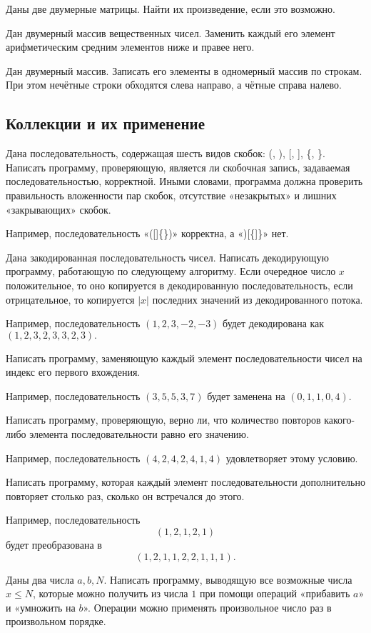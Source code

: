 \task Даны две двумерные матрицы. Найти их произведение, если это
возможно.

\task Дан двумерный массив вещественных чисел. Заменить каждый его
элемент арифметическим средним элементов ниже и правее него.

\task Дан двумерный массив. Записать его элементы в одномерный массив
по строкам. При этом нечётные строки обходятся слева направо, а чётные
справа налево.

\subsection{Коллекции и их применение}

\task Дана последовательность, содержащая шесть видов скобок: (, ), [,
], \{, \}. Написать программу, проверяющую, является ли скобочная
запись, задаваемая последовательностью, корректной. Иными словами,
программа должна проверить правильность вложенности пар скобок,
отсутствие «незакрытых» и лишних «закрывающих» скобок.

Например, последовательность «([]\{\})» корректна, а «)[\{]\}» нет.

\task Дана закодированная последовательность чисел. Написать
декодирующую программу, работающую по следующему алгоритму. Если
очередное число $x$ положительное, то оно копируется в декодированную
последовательность, если отрицательное, то копируется $|x|$ последних
значений из декодированного потока.

Например, последовательность $(1, 2, 3, -2, -3)$ будет декодирована как
$(1, 2, 3, 2, 3, 3, 2, 3).$

\task Написать программу, заменяющую каждый элемент последовательности
чисел на индекс его первого вхождения.

Например, последовательность $(3, 5, 5, 3, 7)$ будет заменена на
$(0, 1, 1, 0, 4).$

\task Написать программу, проверяющую, верно ли, что количество
повторов какого-либо элемента последовательности равно его значению.

Например, последовательность $(4, 2, 4, 2, 4, 1, 4)$ удовлетворяет
этому условию.

\task Написать программу, которая каждый элемент последовательности
дополнительно повторяет столько раз, сколько он встречался до этого.

Например, последовательность
\[
(1, 2, 1, 2, 1)
\]
будет преобразована в 
\[
(1, 2, 1, 1, 2, 2, 1, 1, 1).
\]

\task Даны два числа $a, b, N.$ Написать программу, выводящую все
возможные числа $x \leqslant N$, которые можно получить из числа $1$
при помощи операций «прибавить $a$» и «умножить на $b$». Операции
можно применять произвольное число раз в произвольном порядке.


